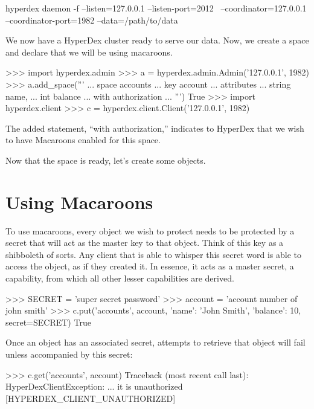 \begin{consolecode}
hyperdex daemon -f --listen=127.0.0.1 --listen-port=2012 \
                   --coordinator=127.0.0.1 --coordinator-port=1982 --data=/path/to/data
\end{consolecode}

We now have a HyperDex cluster ready to serve our data.  Now, we create a space
and declare that we will be using macaroons.

\begin{pythoncode}
>>> import hyperdex.admin
>>> a = hyperdex.admin.Admin('127.0.0.1', 1982)
>>> a.add_space('''
... space accounts
... key account
... attributes
...    string name,
...    int balance
... with authorization
... ''')
True
>>> import hyperdex.client
>>> c = hyperdex.client.Client('127.0.0.1', 1982)
\end{pythoncode}

The added statement, ``with authorization,'' indicates to HyperDex that we wish
to have Macaroons enabled for this space.

Now that the space is ready, let's create some objects.

\section{Using Macaroons}

To use macaroons, every object we wish to protect needs to be protected by a
secret that will act as the master key to that object. Think of this key as a
shibboleth of sorts. Any client that is able to whisper this secret word is able
to access the object, as if they created it. In essence, it acts as a master
secret, a capability, from which all other lesser capabilities are derived.

\begin{pythoncode}
>>> SECRET = 'super secret password'
>>> account = 'account number of john smith'
>>> c.put('accounts', account, {'name': 'John Smith', 'balance': 10}, secret=SECRET)
True
\end{pythoncode}

Once an object has an associated secret, attempts to retrieve that object will
fail unless accompanied by this secret:

\begin{pythoncode}
>>> c.get('accounts', account)
Traceback (most recent call last):
HyperDexClientException: ... it is unauthorized [HYPERDEX_CLIENT_UNAUTHORIZED]
\end{pythoncode}

